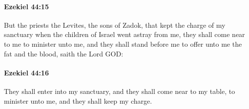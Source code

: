 		\paragraph{Ezekiel 44:15} %
			\label{EZEKIEL-44-15}

			But the priests the Levites, the sons of Zadok, that kept the charge of my sanctuary when the children of Israel went astray from me, they shall come near to me to minister unto me, and they shall stand before me to offer unto me the fat and the blood, saith the Lord GOD:


		\paragraph{Ezekiel 44:16} %
			\label{EZEKIEL-44-16}

			They shall enter into my sanctuary, and they shall come near to my table, to minister unto me, and they shall keep my charge.

